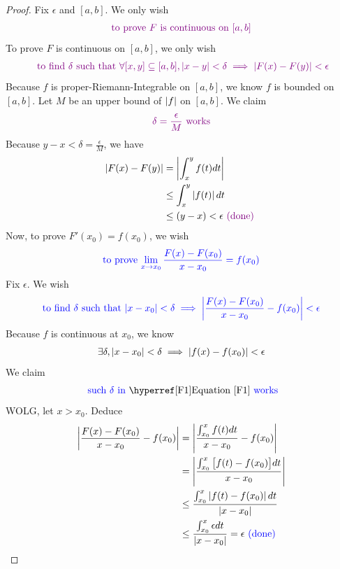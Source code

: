\documentclass{report}
\begin{document}
\begin{proof}
Fix $\epsilon $ and $[a,b]$. We only wish  
\begin{align*}
\textcolor{violet}{\text{ to prove }F\text{ is continuous on $[a,b]$ }}
\end{align*}
To prove $F$ is continuous on  $[a,b]$, we only wish 
\begin{align*}
\textcolor{violet}{\text{ to find $\delta$ such that $\forall [x,y]\subseteq [a,b], \left|x-y\right|<\delta \implies \left|F(x)-F(y)\right|<\epsilon $}}
\end{align*}
Because $f $ is proper-Riemann-Integrable on $[a,b]$, we know $f$ is bounded on  $[a,b]$. Let $M$ be an upper bound of  $\left|f\right|$ on $[a,b]$. We claim 
\begin{align*}
\textcolor{violet}{\text{ $\delta=\frac{\epsilon}{M}$ works }} 
\end{align*}
Because $y-x <\delta=\frac{\epsilon}{M}$, we have
\begin{align*}
  \left|F(x)-F(y)\right|&=\left|\int_x^y f(t)dt\right|\\
  &\leq \int_x^y \left|f(t)\right|dt\\
  &\leq (y-x)<\epsilon \textcolor{violet}{\text{ (done) }}
\end{align*}
Now, to prove $F'(x_0)=f(x_0)$, we wish 
\begin{align*}
  \textcolor{blue}{\text{ to prove $\lim_{x\to x_0} \frac{F(x)-F(x_0)}{x-x_0}= f(x_0)$ }}
\end{align*}
Fix $\epsilon $. We wish 
\begin{align*}
\textcolor{blue}{\text{ to find $\delta$ such that $\left|x-x_0\right|<\delta \implies \left|\frac{F(x)-F(x_0)}{x-x_0}-f(x_0)\right|<\epsilon $ }}
\end{align*}
Because $f$ is continuous at $x_0$, we know  
\begin{align}
\label{F1}
\exists \delta, \left|x-x_0\right|<\delta \implies \left|f(x)-f(x_0)\right|<\epsilon 
\end{align}
We claim 
\begin{align*}
\blue{\text{ such $\delta$ in}}\text{ \myref{Equation}{F1} }\blue{\text{works}}
\end{align*}
WOLG, let $x>x_0$. Deduce 
\begin{align*}
\left|\frac{F(x)-F(x_0)}{x-x_0}-f(x_0)\right|&=\left|\frac{\int_{x_0}^x f(t)dt}{x-x_0}-f(x_0)\right|\\                  &=\left|\frac{\int_{x_0}^x \big[f(t)-f(x_0) \big]dt}{x-x_0}\right|\\
&\leq \frac{\int_{x_0}^x \left|f(t)-f(x_0)\right|dt}{\left|x-x_0\right|}\\
&\leq \frac{\int_{x_0}^x \epsilon dt}{\left|x-x_0\right|}=\epsilon \textcolor{blue}{\text{ (done) }}
\end{align*}
\end{proof}
\end{document}
